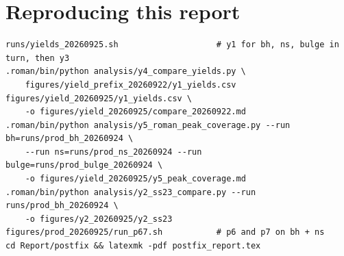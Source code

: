 \documentclass[english,10pt,a4paper]{article}
\begin{document}
\section*{Reproducing this report}

\begin{verbatim}
runs/yields_20260925.sh                    # y1 for bh, ns, bulge in turn, then y3
.roman/bin/python analysis/y4_compare_yields.py \
    figures/yield_prefix_20260922/y1_yields.csv figures/yield_20260925/y1_yields.csv \
    -o figures/yield_20260925/compare_20260922.md
.roman/bin/python analysis/y5_roman_peak_coverage.py --run bh=runs/prod_bh_20260924 \
    --run ns=runs/prod_ns_20260924 --run bulge=runs/prod_bulge_20260924 \
    -o figures/yield_20260925/y5_peak_coverage.md
.roman/bin/python analysis/y2_ss23_compare.py --run runs/prod_bh_20260924 \
    -o figures/y2_20260925/y2_ss23
figures/prod_20260925/run_p67.sh           # p6 and p7 on bh + ns
cd Report/postfix && latexmk -pdf postfix_report.tex
\end{verbatim}



\end{document}
